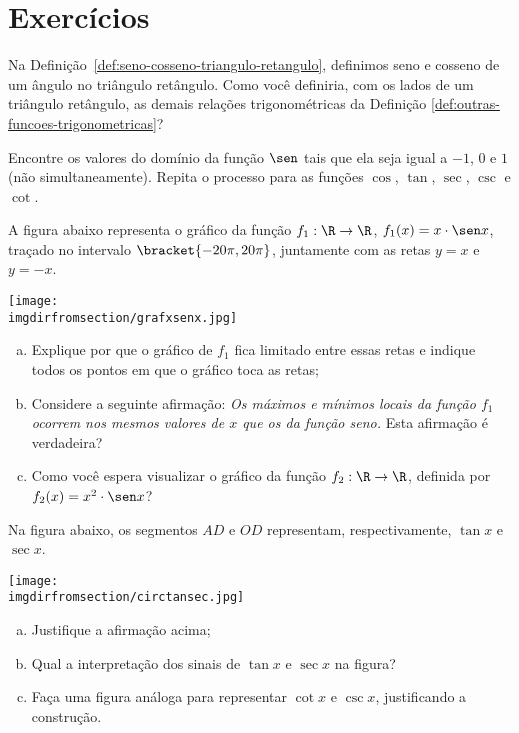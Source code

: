 \section{Exercícios}

\begin{exercise}
    Na Definição~\ref{def:seno-cosseno-triangulo-retangulo}, definimos seno e cosseno de um ângulo no
triângulo retângulo. Como você definiria, com os lados de um
triângulo retângulo, as demais relações trigonométricas da Definição
\ref{def:outras-funcoes-trigonometricas}?
\end{exercise}

\begin{exercise}
  Encontre os valores do domínio da função $\sen$ tais que ela seja igual a $-1$, $0$ e $1$ (não simultaneamente). 
  Repita o processo para as funções $\cos$, $\tan$, $\sec$, $\csc$ e $\cot$.
\end{exercise}

\begin{exercise}
    A figura abaixo representa o gráfico da função $f_1 : \R \to
\R$, $f_1(x) = x \cdot \sen x$, traçado no intervalo $\bracket{-20 \pi,
20 \pi}$, juntamente com as retas $y=x$ e $y=-x$.
\begin{center}
\texttt{[image: \\imgdirfromsection/grafxsenx.jpg]}
\end{center}
\begin{enumerate}[(a)]
  \item Explique por que o gráfico de $f_1$ fica limitado entre
  essas retas e indique todos os pontos em que o gráfico toca as retas;
  \item Considere a seguinte afirmação: \emph{Os máximos e
  mínimos locais da função $f_1$ ocorrem nos mesmos valores
  de $x$ que os da função seno.} Esta afirmação é verdadeira?
  \item Como você espera visualizar o gráfico da função $f_2: \R \to
  \R$, definida por $f_2(x) = x^2 \cdot \sen x$?
\end{enumerate}
\end{exercise}

\begin{exercise}
    Na figura abaixo, os segmentos $AD$ e $OD$ representam,
respectivamente, $\tan x$ e $\sec x$.
\begin{center}
\texttt{[image: \\imgdirfromsection/circtansec.jpg]}
\end{center}
\begin{enumerate}[(a)]
  \item Justifique a afirmação acima;
  \item Qual a interpretação dos sinais de $\tan x$ e $\sec x$ na
  figura?
  \item Faça uma figura análoga para representar $\cot x$ e $\csc
  x$, justificando a construção.
\end{enumerate}
\end{exercise}

